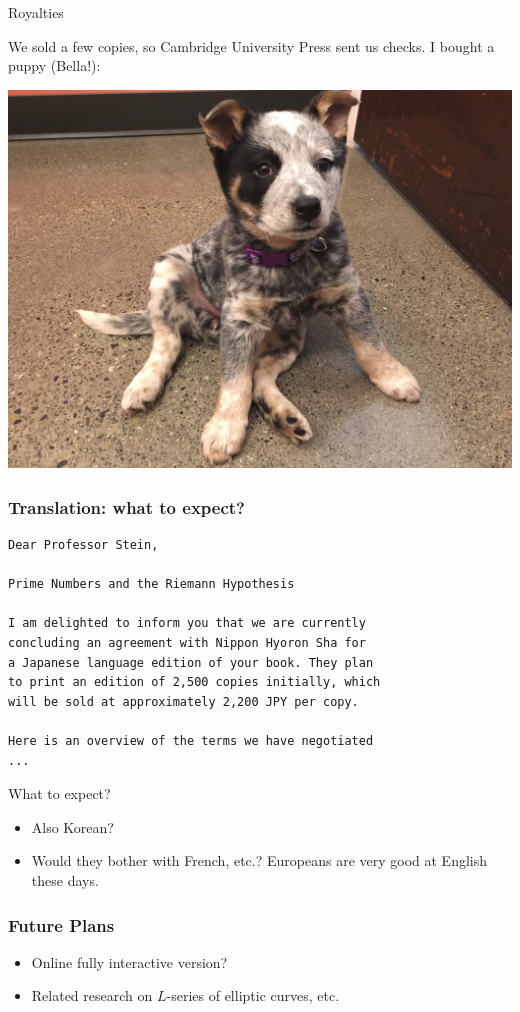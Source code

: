 \documentclass[draft]{beamer}
\begin{document}
\begin{frame}{Royalties}

  We sold a few copies, so Cambridge University Press sent us checks.
  I bought a puppy (Bella!):

  \begin{center}
    \includegraphics[width=.8\textwidth]{pics/bella-puppy.png}
  \end{center}


\end{frame}


\begin{frame}[fragile]
  \frametitle{Translation: what to expect?}
  \begin{verbatim}
Dear Professor Stein,

Prime Numbers and the Riemann Hypothesis

I am delighted to inform you that we are currently
concluding an agreement with Nippon Hyoron Sha for
a Japanese language edition of your book. They plan
to print an edition of 2,500 copies initially, which
will be sold at approximately 2,200 JPY per copy.

Here is an overview of the terms we have negotiated
...
\end{verbatim}

What to expect?
  \begin{itemize}
    \item  Also Korean?
    \item  Would they bother with French, etc.?  Europeans are very good at English these days.
  \end{itemize}
\end{frame}


\begin{frame}
  \frametitle{Future Plans}
  \begin{itemize}
    \item Online fully interactive version?
    \item Related research on $L$-series of elliptic curves, etc.
  \end{itemize}
\end{frame}
\end{document}
